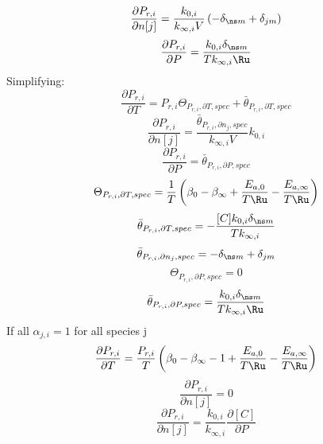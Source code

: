 \documentclass[a4paper,10pt]{article}
\begin{document}
\begin{dmath} \frac{\partial P_{r, i} }{\partial n[j] } = \frac{k_{0, i}}{k_{\infty, i} V} \left(- \delta_{\ns m} + \delta_{j m}\right)\end{dmath} 
\begin{dmath} \frac{\partial P_{r, i} }{\partial P } = \frac{k_{0, i} \delta_{\ns m}}{T k_{\infty, i} \Ru}\end{dmath} 
Simplifying:
\begin{dmath} \frac{\partial P_{r, i} }{\partial T } = P_{r, i} \Theta_{P_{r,i}, \partial T, spec} + \bar{\theta}_{P_{r, i}, \partial T, spec}\end{dmath} 
\begin{dmath} \frac{\partial P_{r, i} }{\partial n[j] } = \frac{\bar{\theta}_{P_{r, i}, \partial n_j, spec}}{k_{\infty, i} V} k_{0, i}\end{dmath} 
\begin{dmath} \frac{\partial P_{r, i} }{\partial P } = \bar{\theta}_{P_{r, i}, \partial P, spec}\end{dmath} 
\begin{dmath} \Theta_{P_{r,i}, \partial T, spec} = \frac{1}{T} \left(\beta_{0} - \beta_{\infty} + \frac{E_{a, 0}}{T \Ru} - \frac{E_{a, \infty}}{T \Ru}\right)\end{dmath} 
\begin{dmath} \bar{\theta}_{P_{r, i}, \partial T, spec} = - \frac{[C] k_{0, i} \delta_{\ns m}}{T k_{\infty, i}}\end{dmath} 
\begin{dmath} \bar{\theta}_{P_{r, i}, \partial n_j, spec} = - \delta_{\ns m} + \delta_{j m}\end{dmath} 
\begin{dmath} \Theta_{P_{r,i}, \partial P, spec} = 0\end{dmath} 
\begin{dmath} \bar{\theta}_{P_{r, i}, \partial P, spec} = \frac{k_{0, i} \delta_{\ns m}}{T k_{\infty, i} \Ru}\end{dmath} 
If all $\alpha_{j, i} = 1$ for all species j
\begin{dmath} \frac{\partial P_{r, i} }{\partial T } = \frac{P_{r, i}}{T} \left(\beta_{0} - \beta_{\infty} - 1 + \frac{E_{a, 0}}{T \Ru} - \frac{E_{a, \infty}}{T \Ru}\right)\end{dmath} 
\begin{dmath} \frac{\partial P_{r, i} }{\partial n[j] } = 0\end{dmath} 
\begin{dmath} \frac{\partial P_{r, i} }{\partial n[j] } = \frac{k_{0, i}}{k_{\infty, i}} \frac{\partial [C] }{\partial P }\end{dmath} 
\end{document}
